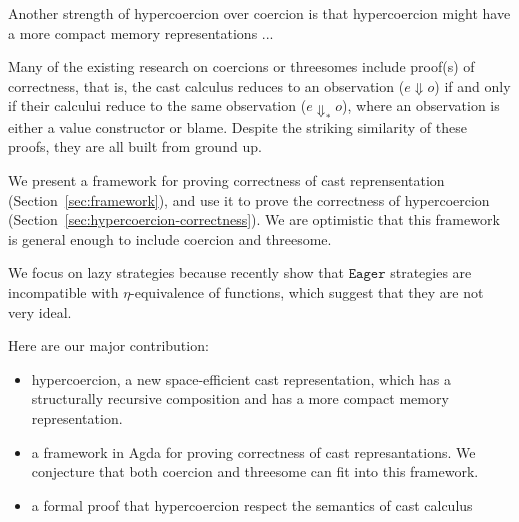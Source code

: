 \documentclass[acmsmall,review,anonymous]{acmart}\settopmatter{printfolios=true,printccs=false,printacmref=false}
\newcommand{\eager}{$\mathtt{Eager}$}
\begin{document}
Another strength of hypercoercion over coercion is that hypercoercion might 
have a more compact memory representations ...

Many of the existing research on coercions or threesomes include proof(s) of 
correctness, that is, the cast calculus reduces to an observation ($ e 
\Downarrow o $) if and only if their calcului reduce to the same observation ($ 
e \Downarrow_{*} o $), where an observation is either a value constructor or 
blame. 
Despite the striking similarity of these proofs, they are all built from ground 
up.

We present a framework for proving correctness of cast reprensentation 
(Section~\ref{sec:framework}), and use it to prove the correctness of 
hypercoercion (Section~\ref{sec:hypercoercion-correctness}). We are optimistic 
that this framework is general enough to include coercion and threesome.

We focus on lazy strategies because recently \citet{new2019gradual} 
show that \eager{} strategies are incompatible with $\eta$-equivalence of 
functions, which suggest that they are not very ideal. 

Here are our major contribution:
\begin{itemize}
	\item hypercoercion, a new space-efficient cast representation, which has a 
	structurally recursive composition and has a more compact memory 
	representation.
	\item a framework in Agda for proving correctness of cast represantations. 
	We conjecture that both coercion and threesome can fit into this framework.
	\item a formal proof that hypercoercion respect the semantics of cast 
	calculus
\end{itemize}
\end{document}
